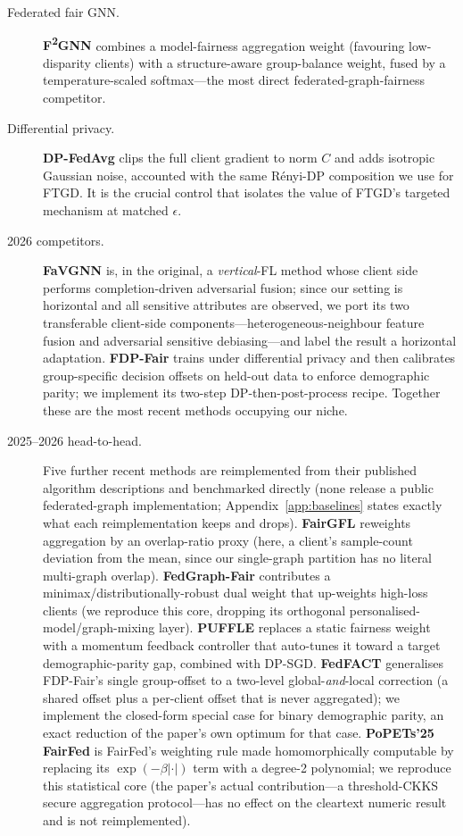 \documentclass[pdflatex,sn-mathphys-num]{sn-jnl}
\theoremstyle{thmstyleone}%
\theoremstyle{thmstyletwo}%
\theoremstyle{thmstylethree}%
\begin{document}
\begin{description}
\item[Federated fair GNN.] \textbf{F\textsuperscript{2}GNN} \cite{f2gnn2023}
combines a model-fairness aggregation weight (favouring low-disparity clients)
with a structure-aware group-balance weight, fused by a temperature-scaled
softmax---the most direct federated-graph-fairness competitor.

\item[Differential privacy.] \textbf{DP-FedAvg} \cite{mcmahan2018learning} clips
the full client gradient to norm $C$ and adds isotropic Gaussian noise,
accounted with the same R\'enyi-DP composition we use for FTGD. It is the crucial
control that isolates the value of FTGD's targeted mechanism at matched
$\epsilon$.

\item[2026 competitors.] \textbf{FaVGNN} \cite{wang2026favgnn} is, in the
original, a \emph{vertical}-FL method whose client side performs
completion-driven adversarial fusion; since our setting is horizontal and all
sensitive attributes are observed, we port its two transferable client-side
components---heterogeneous-neighbour feature fusion and adversarial sensitive
debiasing---and label the result a horizontal adaptation. \textbf{FDP-Fair}
\cite{xue2026fdpfair} trains under differential privacy and then calibrates
group-specific decision offsets on held-out data to enforce demographic parity;
we implement its two-step DP-then-post-process recipe. Together these are the
most recent methods occupying our niche.

\item[2025--2026 head-to-head.] Five further recent methods are reimplemented
from their published algorithm descriptions and benchmarked directly (none
release a public federated-graph implementation; Appendix~\ref{app:baselines}
states exactly what each reimplementation keeps and drops). \textbf{FairGFL}
\cite{fairgfl2025} reweights aggregation by an overlap-ratio proxy (here, a
client's sample-count deviation from the mean, since our single-graph
partition has no literal multi-graph overlap). \textbf{FedGraph-Fair}
\cite{fedgraphfair2025} contributes a minimax/distributionally-robust dual
weight that up-weights high-loss clients (we reproduce this core, dropping its
orthogonal personalised-model/graph-mixing layer). \textbf{PUFFLE}
\cite{corbucci2024puffle} replaces a static fairness weight with a momentum
feedback controller that auto-tunes it toward a target demographic-parity
gap, combined with DP-SGD. \textbf{FedFACT} \cite{fedfact2025} generalises
FDP-Fair's single group-offset to a two-level global-\emph{and}-local
correction (a shared offset plus a per-client offset that is never
aggregated); we implement the closed-form special case for binary
demographic parity, an exact reduction of the paper's own optimum for that
case. \textbf{PoPETs'25 FairFed} \cite{bendoukha2025popets} is FairFed's
weighting rule made homomorphically computable by replacing its
$\exp(-\beta|\cdot|)$ term with a degree-2 polynomial; we reproduce this
statistical core (the paper's actual contribution---a threshold-CKKS secure
aggregation protocol---has no effect on the cleartext numeric result and is
not reimplemented).


\end{description}
\end{document}
